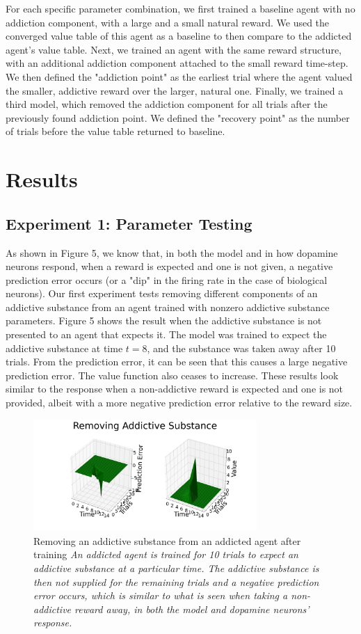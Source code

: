 \documentclass[10pt,letterpaper]{article}
\begin{document}
For each specific parameter combination, we first trained a baseline agent with no addiction component, with a large and a small natural reward. We used the converged value table of this agent as a baseline to then compare to the addicted agent's value table. Next, we trained an agent with the same reward structure, with an additional addiction component attached to the small reward time-step. We then defined the "addiction point" as the earliest trial where the agent valued the smaller, addictive reward over the larger, natural one. Finally, we trained a third model, which removed the addiction component for all trials after the previously found addiction point. We defined the "recovery point" as the number of trials before the value table returned to baseline.


\section{Results}
\subsection{Experiment 1: Parameter Testing}
As shown in Figure 5, we know that, in both the model and in how dopamine neurons respond, when a reward is expected and one is not given, a negative prediction error occurs (or a "dip" in the firing rate in the case of biological neurons). Our first experiment tests removing different components of an addictive substance from an agent trained with nonzero addictive substance parameters. Figure 5 shows the result when the addictive substance is not presented to an agent that expects it. The model was trained to expect the addictive substance at time $t = 8$, and the substance was taken away after 10 trials. From the prediction error, it can be seen that this causes a large negative prediction error. The value function also ceases to increase. These results look similar to the response when a non-addictive reward is expected and one is not provided, albeit with a more negative prediction error relative to the reward size.

\begin{figure}[H]
   \centering
    \includegraphics[width = 85mm]{graphs/add_remove.png}
    \caption{Removing an addictive substance from an addicted agent after training
    \newline \emph{An addicted agent is trained for 10 trials to expect an addictive substance at a particular time. The addictive substance is then not supplied for the remaining trials and a negative prediction error occurs, which is similar to what is seen when taking a non-addictive reward away, in both the model and dopamine neurons' response.}}
    \label{fig:Baseline}
\end{figure}
\end{document}
